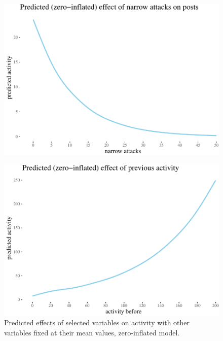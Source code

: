 \documentclass[10pt,dvipsnames]{scrartcl}
\begin{document}
\begin{figure}

\begin{center}\includegraphics[width=0.85\linewidth]{quittingShortAbridgedRevisions2_files/figure-latex/unnamed-chunk-56-1} \end{center}
\end{figure}

\begin{figure}

\begin{center}\includegraphics[width=0.85\linewidth]{quittingShortAbridgedRevisions2_files/figure-latex/unnamed-chunk-57-1} \end{center}
\caption{Predicted effects of selected variables on activity with other variables fixed at their mean values, zero-inflated model.}
\label{fig:effects2}
\end{figure}
\end{document}
